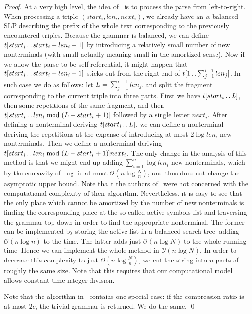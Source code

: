 \documentclass[runningheads]{llncs}
\newcommand{\twodots}{\mathinner{\ldotp\ldotp}}
\begin{document}
\begin{proof}
At a very high level, the idea of~\cite{CharikarApproximation} is to process the parse from left-to-right. When processing a triple $(start_i,len_i,next_i)$, we already have an $\alpha$-balanced SLP describing the prefix of the whole text corresponding to the previously encountered triples. Because the grammar is balanced, we can define $t[start_i\twodots start_i+len_i-1]$ by introducing a relatively small number of new nonterminals (with small actually meaning small in the amortized sense). Now if we allow the parse to be self-referential, it might happen that $t[start_i\twodots start_i+len_i-1]$ sticks out from the right end of $t[1\twodots \sum_{j=1}^{i-1}len_j]$. In such case we do as follows: let $L=\sum_{j=1}^{i-1}len_j$, and split the fragment corresponding to the current triple into three parts. First we have $t[start_i\twodots L]$, then some repetitions of the same fragment, and then $t[start_i\twodots len_i\bmod (L-start_i+1)]$ followed by a single letter $next_i$. After defining a nonterminal deriving $t[start_i\twodots L]$, we can define a nonterminal deriving the repetitions at the expense of introducing at most $2\log len_i$ new nonterminals. Then we define a nonterminal deriving $t[start_i\twodots len_i\bmod (L-start_i+1)] next_i$. The only change in the analysis of this method is that we might end up adding $\sum_{i=1}^{n} \log len_i$ new nonterminals, which by the concavity of $\log$ is at most $\mathcal{O}(n\log\frac{N}{n})$, and thus does not change the asymptotic upper bound. Note tha~t the authors of~\cite{CharikarApproximation} were not concerned with the computational complexity of their algorithm. Nevertheless, it is easy to see that the only place which cannot be amortized by the number of new nonterminals is finding the corresponding place at the so-called active symbols list and traversing the grammar top-down in order to find the appropriate nonterminal. The former can be implemented by storing the active list in a balanced search tree, adding $\mathcal{O}(n\log n)$ to the time. The latter adds just $\mathcal{O}(n\log N)$ to the whole running time. Hence we can implement the whole method in $\mathcal{O}(n\log N)$. In order to decrease this complexity to just $\mathcal{O}(n\log\frac{N}{n})$, we cut the string into $n$ parts of roughly the same size. Note that this requires that our computational model allows constant time integer division.

Note that the algorithm in~\cite{CharikarApproximation} contains one special case: if the compression ratio is at most $2e$, the trivial grammar is returned. We do the same.
\qed
\end{proof}
\end{document}
